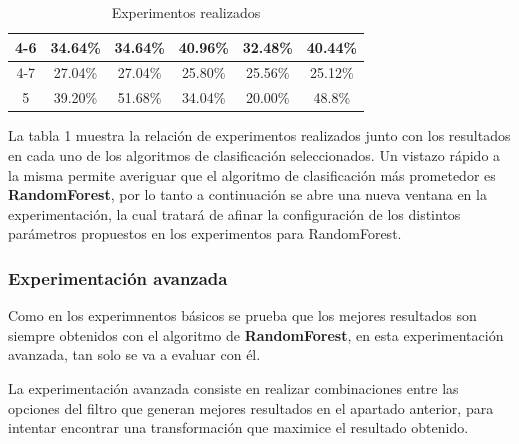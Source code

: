 \documentclass[12pt,a4paper, xcolor=table]{article}
\begin{document}
\begin{table}[h]
\begin{tabular}{|c|c|c|c|c|c|}
            4-6                     & 34.64\%                   & 34.64\%        & 40.96\%                    & 32.48\%         & 40.44\%            \\ \hline
            4-7                     & 27.04\%                   & 27.04\%        & 25.80\%                    & 25.56\%         & 25.12\%            \\ \hline
            5                       & 39.20\%                   & 51.68\%        & 34.04\%                    & 20.00\%         & 48.8\%            \\ \hline
            \end{tabular}
            \caption{Experimentos realizados}
                \label{fig:graf_exp1}
        \end{table}

        La tabla 1 muestra la relación de experimentos realizados junto con los resultados en cada uno de los algoritmos de clasificación seleccionados. Un vistazo rápido a la misma permite averiguar que el algoritmo de clasificación más prometedor es \textbf{RandomForest}, por lo tanto a continuación se abre una nueva ventana en la experimentación, la cual tratará de afinar la configuración de los distintos parámetros propuestos en los experimentos para RandomForest.

        \subsubsection{Experimentación avanzada}

        Como en los experimnentos básicos se prueba que los mejores resultados son siempre obtenidos con el algoritmo de \textbf{RandomForest}, en esta experimentación avanzada, tan solo se va a evaluar con él.

        \vspace{3mm}

        La experimentación avanzada consiste en realizar combinaciones entre las opciones del filtro que generan mejores resultados en el apartado anterior, para intentar encontrar una transformación que maximice el resultado obtenido.
\end{document}

